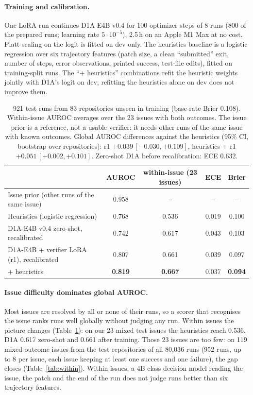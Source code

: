\documentclass[11pt]{article}
\begin{document}
\paragraph{Training and calibration.} One LoRA run continues D1A-E4B v0.4 for 100 optimizer steps of 8 runs (800 of the prepared runs; learning rate
$5\cdot10^{-5}$), 2.5\,h on an Apple M1 Max at no cost. Platt scaling on the logit is fitted on dev only. The heuristics baseline is a logistic regression over six
trajectory features (patch size, a clean ``submitted'' exit, number of steps, error observations, printed success, test-file edits), fitted on training-split runs.
The ``+ heuristics'' combinations refit the heuristic weights jointly with D1A's logit on dev; refitting the heuristics alone on dev does not improve them.

\begin{table}[h]\centering\small
\begin{tabular}{lcccc}\toprule
& AUROC & within-issue (23 issues) & ECE & Brier \\\midrule
Issue prior (other runs of the same issue) & 0.958 & -- & -- & -- \\\midrule
Heuristics (logistic regression) & 0.768 & 0.536 & 0.019 & 0.100 \\
D1A-E4B v0.4 zero-shot, recalibrated & 0.742 & 0.617 & 0.043 & 0.103 \\
D1A-E4B + verifier LoRA (r1), recalibrated & 0.807 & 0.661 & 0.039 & 0.097 \\
\quad + heuristics & \textbf{0.819} & \textbf{0.667} & 0.037 & \textbf{0.094} \\\bottomrule
\end{tabular}
\caption{921 test runs from 83 repositories unseen in training (base-rate Brier 0.108). Within-issue AUROC averages over the 23 issues with both outcomes.
The issue prior is a reference, not a usable verifier: it needs other runs of the same issue with known outcomes.
Global AUROC differences against the heuristics (95\% CI, bootstrap over repositories): r1 $+0.039\,[-0.030, +0.109]$, heuristics + r1
$+0.051\,[+0.002, +0.101]$. Zero-shot D1A before recalibration: ECE 0.632.}\label{tab:verifier}
\end{table}

\paragraph{Issue difficulty dominates global AUROC.} Most issues are resolved by all or none of their runs, so a scorer that recognises the issue ranks runs
well globally without judging any run. Within issues the picture changes (Table~\ref{tab:verifier}): on our 23 mixed test issues the heuristics reach 0.536, D1A 0.617 zero-shot and 0.661 after training.
Those 23 issues are too few: on 119 mixed-outcome issues from the test repositories of all 80{,}036 runs (952 runs, up to 8 per issue, each issue keeping at least
one success and one failure), the gap closes (Table~\ref{tab:within}). Within issues, a 4B-class decision model reading the issue, the patch and the end of the run
does not judge runs better than six trajectory features.
\end{document}
